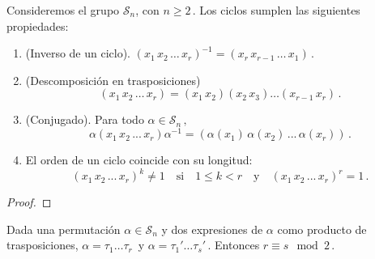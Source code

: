 \begin{nprop}
\label{proposition:propiedades-ciclos}
Consideremos el grupo $\mathcal S_n$, con $n \ge 2$\,. Los ciclos sumplen las siguientes propiedades:

\begin{enumerate}
  \item (Inverso de un ciclo). $(x_1 \, x_2 \, \hdots \, x_r)^{-1} = (x_r \, x_{r-1} \, \hdots \, x_1)$\,.
  \item (Descomposición en trasposiciones) \begin{equation*}
    (x_1 \, x_2 \, \hdots \, x_r) = (x_1 \, x_2)(x_2 \, x_3) \hdots (x_{r-1} \, x_r)\,.
  \end{equation*}
  \item (Conjugado). Para todo $\alpha \in \mathcal S_n\,,$ \begin{equation*}
    \alpha (x_1 \, x_2 \, ... \, x_r) \alpha^{-1} = \left(\alpha(x_1) \, \alpha(x_2) \, ... \, \alpha(x_r)\right)\,.
  \end{equation*}
  \item El orden de un ciclo coincide con su longitud: \begin{equation*}
    (x_1 \, x_2 \, ... \, x_r)^k \neq 1 \quad \text{si} \quad 1 \le k < r \quad \text{y}\quad (x_1 \, x_2 \, ... \, x_r)^r = 1\,.
  \end{equation*}
\end{enumerate}
\end{nprop}

\begin{proof}

\end{proof}

\begin{nth}\label{theorem:paridad-permutacion} 
Dada una permutación $\alpha \in \mathcal S_n$ y dos expresiones de $\alpha$ como producto de trasposiciones, $\alpha = \tau_1\hdots\tau_r$\, y $\alpha = \tau_1'\hdots\tau_s'$\,. Entonces $r \equiv s \mod 2$\,.
\end{nth}

